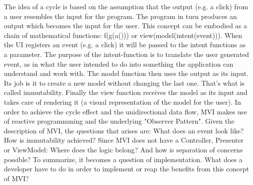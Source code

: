 The idea of a cycle is based on the assumption that the output (e.g. a click) from a user resembles the input for the program. The program in turn produces an output 
which becomes the input for the user. This concept can be embodied as a chain of mathematical functions: f(g(a())) or view(model(intent(event))).
When the UI registers an event (e.g. a click) it will be passed to the intent functions as a parameter. The purpose of the intent-function is 
to translate the user generated event, as in what the user intended to do into something the application can understand and work with.
The model function then uses the output as its input. Its job is it to create a new model without changing the last one. That's what is called immutability.
Finally the view function receives the model as its input and takes care of rendering it (a visual representation of the model for the user). 
In order to achieve the cycle effect and the unidirectional data flow, MVI makes use of reactive programmming and the underlying "Observer Pattern".
Given the description of MVI, the questions that arises are: What does an event look like? How is immutability achieved?
Since MVI does not have a Controller, Presenter or ViewModel: Where does the logic belong? And how is separation of concerns possible?
To summarize, it becomes a question of implementation. What does a developer have to do in order to implement or reap the benefits from this concept of MVI?